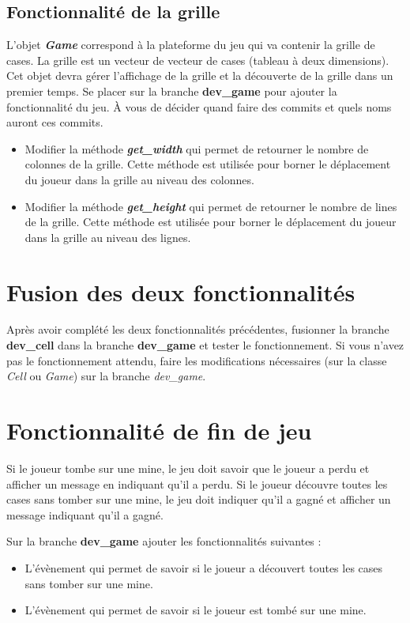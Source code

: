 \subsection{Fonctionnalité de la grille}
L'objet \textit{\textbf{Game}} correspond à la plateforme du jeu qui va contenir la grille de cases. La grille est un vecteur de vecteur de cases (tableau à deux dimensions). Cet objet devra gérer l'affichage de la grille et la découverte de la grille dans un premier temps. Se placer sur la branche \textbf{dev\_game} pour ajouter la fonctionnalité du jeu. À vous de décider quand faire des commits et quels noms auront ces commits.

\medskip

\begin{itemize}
    \item Modifier la méthode \textit{\textbf{get\_width}} qui permet de retourner le nombre de colonnes de la grille. Cette méthode est utilisée pour borner le déplacement du joueur dans la grille au niveau des colonnes.
    \medskip
    \item Modifier la méthode \textit{\textbf{get\_height}} qui permet de retourner le nombre de lines de la grille. Cette méthode est utilisée pour borner le déplacement du joueur dans la grille au niveau des lignes.
\end{itemize}


\medskip

\section{Fusion des deux fonctionnalités}
Après avoir complété les deux fonctionnalités précédentes, fusionner la branche \textbf{dev\_cell} dans la branche \textbf{dev\_game} et tester le fonctionnement. Si vous n'avez pas le fonctionnement attendu, faire les modifications nécessaires (sur la classe \textit{Cell} ou \textit{Game}) sur la branche \textit{dev\_game}.

\section{Fonctionnalité de fin de jeu}
Si le joueur tombe sur une mine, le jeu doit savoir que le joueur a perdu et afficher un message en indiquant qu'il a perdu. Si le joueur découvre toutes les cases sans tomber sur une mine, le jeu doit indiquer qu'il a gagné et afficher un message indiquant qu'il a gagné.

\medskip

Sur la branche \textbf{dev\_game} ajouter les fonctionnalités suivantes : 
\begin{itemize}
    \item L'évènement qui permet de savoir si le joueur a découvert toutes les cases sans tomber sur une mine.
    \item L'évènement qui permet de savoir si le joueur est tombé sur une mine.
\end{itemize}

